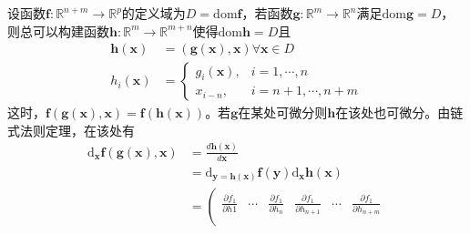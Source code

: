 \documentclass[main.tex]{subfiles}
\begin{document}
\begin{example}\label{exp:II.4.9}
    设函数$\mathbf{f}:\mathbb{R}^{n+m}\rightarrow\mathbb{R}^p$的定义域为$D=\mathrm{dom}\mathbf{f}$，若函数$\mathbf{g}:\mathbb{R}^m\rightarrow\mathbb{R}^n$满足$\mathrm{dom}\mathbf{g}=D$，则总可以构建函数$\mathbf{h}:\mathbb{R}^m\rightarrow\mathbb{R}^{m+n}$使得$\mathrm{dom}\mathbf{h}=D$且
    \begin{align*}
        \mathbf{h}\left(\mathbf{x}\right) & =\left(\mathbf{g}\left(\mathbf{x}\right),\mathbf{x}\right)\forall\mathbf{x}\in D \\
        h_i\left(\mathbf{x}\right)        & =\left\{\begin{array}{ll}
                                                        g_i\left(\mathbf{x}\right), & i=1,\cdots,n     \\
                                                        x_{i-n},                    & i=n+1,\cdots,n+m
                                                    \end{array}\right.
    \end{align*}
    这时，$\mathbf{f}\left(\mathbf{g}\left(\mathbf{x}\right),\mathbf{x}\right)=\mathbf{f}\left(\mathbf{h}\left(\mathbf{x}\right)\right)$。若$\mathbf{g}$在某处可微分则$\mathbf{h}$在该处也可微分。由链式法则定理，在该处有
    \begin{align*}
        \mathrm{d}_\mathbf{x}\mathbf{f}\left(\mathbf{g}\left(\mathbf{x}\right),\mathbf{x}\right) & =\frac{d\mathbf{h}\left(\mathbf{x}\right)}{d\mathbf{x}}                                                                                                                                                                    \\
                                                                                                 & =\mathrm{d}_{\mathbf{y}=\mathbf{h}\left(\mathbf{x}\right)}\mathbf{f}\left(\mathbf{y}\right)\mathrm{d}_\mathbf{x}\mathbf{h}\left(\mathbf{x}\right)                                                                          \\
                                                                                                 & =\left(\begin{array}{cccccc}
                                                                                                                  \frac{\partial f_1}{\partial h1}  & \cdots & \frac{\partial f_1}{\partial h_n} & \frac{\partial f_1}{\partial h_{n+1}} & \cdots & \frac{\partial f_1}{\partial h_{n+m}} \\

\end{array}
\end{align*}
\end{example}
\end{document}
